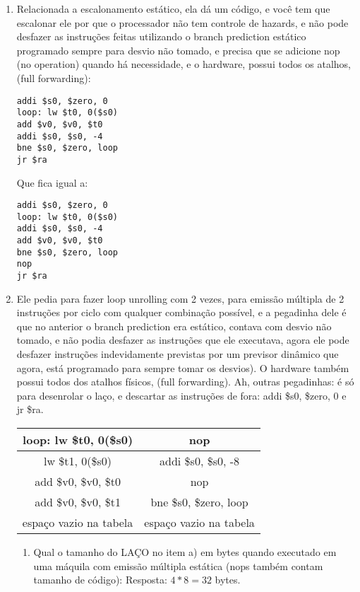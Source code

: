 \documentclass{article}
\begin{document}
\begin{enumerate}
\item Relacionada a escalonamento estático, ela dá um código, e você tem que
escalonar ele por que o processador não tem controle de hazards, e não pode
desfazer as instruções feitas utilizando o branch prediction estático programado
sempre para desvio não tomado, e precisa que se adicione nop (no operation)
quando há necessidade, e o hardware, possui todos os atalhos, (full forwarding):

\begin{verbatim}
addi $s0, $zero, 0
loop: lw $t0, 0($s0)
add $v0, $v0, $t0
addi $s0, $s0, -4
bne $s0, $zero, loop
jr $ra
\end{verbatim}

Que fica igual a:

\begin{verbatim}
addi $s0, $zero, 0
loop: lw $t0, 0($s0)
addi $s0, $s0, -4
add $v0, $v0, $t0
bne $s0, $zero, loop
nop
jr $ra
\end{verbatim}

\item Ele pedia para fazer loop unrolling com 2 vezes, para emissão múltipla de
2 instruções por ciclo com qualquer combinação possível, e a pegadinha dele é
que no anterior o branch prediction era estático, contava com desvio não tomado,
e não podia desfazer as instruções que ele executava, agora ele pode desfazer
instruções indevidamente previstas por um previsor dinâmico que agora, está
programado para sempre tomar os desvios). O hardware também possui todos dos
atalhos físicos, (full forwarding). Ah, outras pegadinhas: é só para desenrolar
o laço, e descartar as instruções de fora: addi \$s0, \$zero, 0 e jr \$ra.


\begin{tabular}{|c|c|}
\hline loop: lw \$t0, 0(\$s0)  & nop \\
\hline lw \$t1, 0(\$s0) & addi \$s0, \$s0, -8 \\
\hline add \$v0, \$v0, \$t0 & nop \\
\hline add \$v0, \$v0, \$t1 & bne \$s0, \$zero, loop \\
\hline espaço vazio na tabela & espaço vazio na tabela \\
\hline
\end{tabular}

\begin{enumerate}
\item Qual o tamanho do LAÇO no item a) em bytes quando executado em uma máquila
com emissão múltipla estática (nops também contam tamanho de código): Resposta:
$4 * 8 = 32$ bytes.


\end{enumerate}
\end{enumerate}
\end{document}
